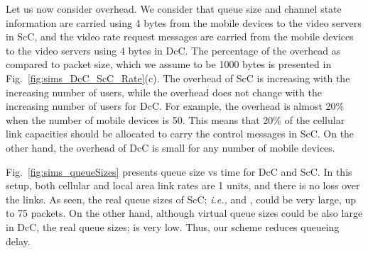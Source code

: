 \documentclass[conference]{IEEEtran}
\newcommand{\ie}{{\em i.e., }}
\begin{document}
\begin{figure*}[t!]
\centering
{}
\vspace{-5pt}
\caption{Average rate per mobile device in unicast and broadcast scenarios for (a) DcC and (b) ScC. (c) Percentage of overhead vs packet size.}
\label{fig:sims_DcC_ScC_Rate}
\end{figure*}

\begin{figure*}[t!]
\centering
{}
\vspace{-5pt}
\caption{Queue Sizes. (a) ScC. Queue sizes at the source. (b) ScC. Queue sizes at the mobile devices. (c) DcC. Real queue sizes at the mobile devices. (d) Virtual queue sizes at the mobile devices.}
\vspace{-5pt}
\label{fig:sims_queueSizes}
\end{figure*}



Let us now consider overhead. We consider that queue size and channel state information are carried using 4 bytes from the mobile devices to the video servers in ScC, and the video rate request messages are carried from the mobile devices to the video servers using 4 bytes in DcC. The percentage of the overhead as compared to packet size, which we assume to be 1000 bytes is presented in Fig.~\ref{fig:sims_DcC_ScC_Rate}(c). The overhead of ScC is increasing with the increasing number of users, while the overhead does not change with the increasing number of users for DcC. For example, the overhead is almost 20\% when the number of mobile devices is 50. This means that 20\% of the cellular link capacities should be allocated to carry the control messages in ScC. On the other hand, the overhead of DcC is small for any number of mobile devices.


Fig.~\ref{fig:sims_queueSizes} presents queue size vs time for DcC and ScC. In this setup, both cellular and local area link rates are 1 units, and there is no loss over the links. As seen, the real queue sizes of ScC; \ie  and , could be very large, up to 75 packets. On the other hand, although virtual queue sizes could be also large in DcC, the real queue sizes;  is very low. Thus, our scheme reduces queueing delay. 
\end{document}
